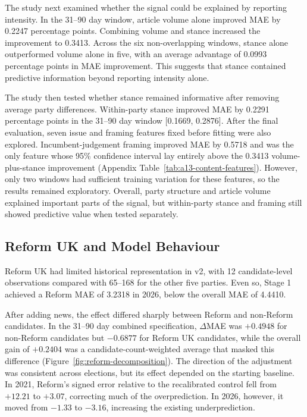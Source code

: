 \documentclass[final-report]{report-template}
\begin{document}
The study next examined whether the signal could be explained by reporting intensity. In the 31--90 day window, article volume alone improved MAE by 0.2247 percentage points. Combining volume and stance increased the improvement to 0.3413. Across the six non-overlapping windows, stance alone outperformed volume alone in five, with an average advantage of 0.0993 percentage points in MAE improvement. This suggests that stance contained predictive information beyond reporting intensity alone.

The study then tested whether stance remained informative after removing average party differences. Within-party stance improved MAE by 0.2291 percentage points in the 31--90 day window [0.1669, 0.2876]. After the final evaluation, seven issue and framing features fixed before fitting were also explored. Incumbent-judgement framing improved MAE by 0.5718 and was the only feature whose 95\% confidence interval lay entirely above the 0.3413 volume-plus-stance improvement (Appendix Table~\ref{tab:a13-content-features}). However, only two windows had sufficient training variation for these features, so the results remained exploratory. Overall, party structure and article volume explained important parts of the signal, but within-party stance and framing still showed predictive value when tested separately.

\subsection{Reform UK and Model Behaviour}
\label{sec:reform}
Reform UK had limited historical representation in v2, with 12 candidate-level observations compared with 65--168 for the other five parties. Even so, Stage 1 achieved a Reform MAE of 3.2318 in 2026, below the overall MAE of 4.4410.

After adding news, the effect differed sharply between Reform and non-Reform candidates. In the 31--90 day combined specification, $\Delta$MAE was $+0.4948$ for non-Reform candidates but $-0.6877$ for Reform UK candidates, while the overall gain of $+0.2404$ was a candidate-count-weighted average that masked this difference (Figure~\ref{fig:reform-decomposition}). The direction of the adjustment was consistent across elections, but its effect depended on the starting baseline. In 2021, Reform's signed error relative to the recalibrated control fell from $+12.21$ to $+3.07$, correcting much of the overprediction. In 2026, however, it moved from $-1.33$ to $-3.16$, increasing the existing underprediction.
\end{document}
